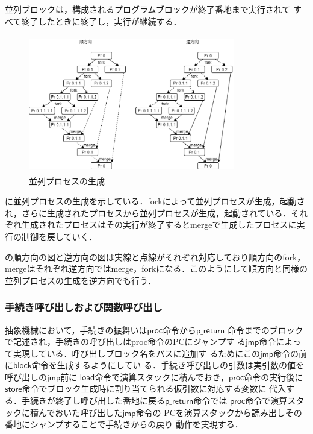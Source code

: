 \documentclass[submit,PRO]{ipsj}
\newcommand{\bcode}[1]{$\mathsf{#1}$}
\begin{document}
並列ブロックは，構成されるプログラムブロックが終了番地まで実行されて
すべて終了したときに終了し，実行が継続する．

\begin{figure}[tb]
\includegraphics[height=6.0cm,width=9.0cm]{parallel.eps}
\caption{並列プロセスの生成}
\label{fig:parallel}
\end{figure}


に並列プロセスの生成を示している．forkによって並列プロセスが生成，起動され，さらに生成されたプロセスから並列プロセスが生成，起動されている．それぞれ生成されたプロセスはその実行が終了するとmergeで生成したプロセスに実行の制御を戻していく．

の順方向の図と逆方向の図は実線と点線がそれぞれ対応しており順方向のfork，mergeはそれぞれ逆方向ではmerge，forkになる．このようにして順方向と同様の並列プロセスの生成を逆方向でも行う．

\subsubsection{手続き呼び出しおよび関数呼び出し}

抽象機械において，手続きの振舞いは\bcode{proc}命令から\bcode{p\_return}
命令までのブロックで記述され，手続きの呼び出しはproc命令のPCにジャンプす
る\bcode{jmp}命令によって実現している．呼び出しブロック名をパスに追加す
るためにこの\bcode{jmp}命令の前に\bcode{block}命令を生成するようにしてい
る．手続き呼び出しの引数は実引数の値を呼び出しの\bcode{jmp}前に
\bcode{load}命令で演算スタックに積んでおき，\bcode{proc}命令の実行後に
\bcode{store}命令でブロック生成時に割り当てられる仮引数に対応する変数に
代入する．手続きが終了し呼び出した番地に戻る\bcode{p\_return}命令では
\bcode{proc}命令で演算スタックに積んでおいた呼び出した\bcode{jmp}命令の
PCを演算スタックから読み出しその番地にシャンプすることで手続きからの戻り
動作を実現する．
\end{document}
